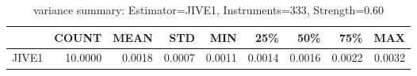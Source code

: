 \begin{table}[ht]
\centering
\caption{variance summary: Estimator=JIVE1, Instruments=333, Strength=0.60}
\begin{tabular}{lrrrrrrrr}
\toprule
 & COUNT & MEAN & STD & MIN & 25\% & 50\% & 75\% & MAX \\
\midrule
JIVE1 & 10.0000 & 0.0018 & 0.0007 & 0.0011 & 0.0014 & 0.0016 & 0.0022 & 0.0032 \\
\bottomrule
\end{tabular}
\end{table}
